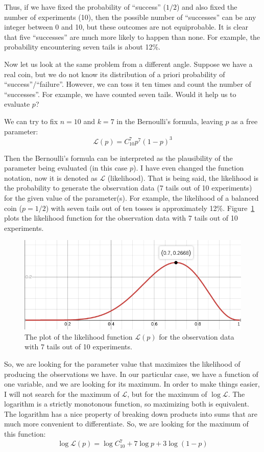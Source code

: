 \documentclass{article}
\begin{document}
Thus, if we have fixed the probability of ``success'' ($1/2$) and also fixed the number of experiments (10), 
then the possible number of ``successes'' can be any integer between 0 and 10, but these outcomes are not equiprobable. 
It is clear that five ``successes'' are much more likely to happen than none. For example, the probability encountering seven tails is about 12\%.

Now let us look at the same problem from a different angle. 
Suppose we have a real coin, but we do not know its distribution of a priori probability of ``success''/``failure''. 
However, we can toss it ten times and count the number of ``successes''. 
For example, we have counted seven tails.
Would it help us to evaluate $p$?

We can try to fix $n=10$ and $k=7$ in the Bernoulli's formula, leaving $p$ as a free parameter:
$$\mathcal{L}(p) = C_{10}^7 p^7 (1-p)^3$$

Then the Bernoulli's formula can be interpreted as the plausibility of the parameter being evaluated (in this case $p$).
I have even changed the function notation, now it is denoted as $\mathcal L$ (likelihood).
That is being said, the likelihood is the probability to generate the observation data (7 tails out of 10 experiments) for the given value of the parameter(s).
For example, the likelihood of a balanced coin ($p=1/2$) with seven tails out of ten tosses is approximately 12\%. 
Figure~\ref{fig:likelihood} plots the likelihood function for the observation data with 7 tails out of 10 experiments.

\begin{figure}[htb!]
\centering
\includegraphics[width=.5\columnwidth]{likehood-07}
\caption{The plot of the likelihood function $\mathcal{L}(p)$ for the observation data with 7 tails out of 10 experiments.}
\label{fig:likelihood}
\end{figure}

So, we are looking for the parameter value that maximizes the likelihood of producing the observations we have.
In our particular case, we have a function of one variable, and we are looking for its maximum.
In order to make things easier, I will not search for the maximum of $\mathcal L$, but for the maximum of $\log \mathcal L$.
The logarithm is a strictly monotonous function, so maximizing both is equivalent.
The logarithm has a nice property of breaking down products into sums that are much more convenient to differentiate.
So, we are looking for the maximum of this function:
$$\log \mathcal{L}(p) = \log C_{10}^7 + 7 \log p + 3\log (1-p)$$
\end{document}
